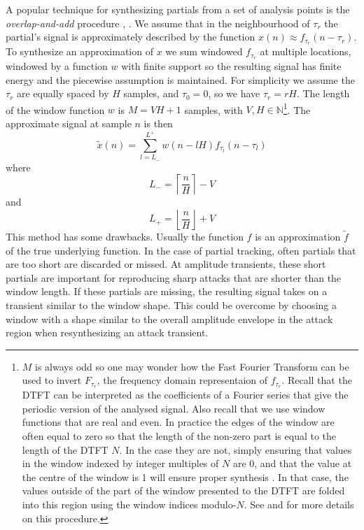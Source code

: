 A popular technique for synthesizing partials from a set of analysis points is
the \textit{overlap-and-add} procedure \cite{portnoff1976implementation},
\cite{moore1990elements}. We assume that in the neighbourhood of $\tau_{r}$ the
partial's signal is approximately described by the function $x(n) \approx
f_{\tau_{r}}(n-\tau_{r})$. To synthesize an approximation of $x$ we sum windowed
$f_{\tau_{r}}$ at multiple locations, windowed by a function $w$ with finite
support so the resulting signal has finite energy and the piecewise assumption
is maintained. For simplicity we assume the $\tau_{r}$ are equally spaced by $H$
samples, and $\tau_{0}=0$, so we have $\tau_{r} = rH$. The length of the window
function $w$ is $M = VH + 1$ samples, with $V,H \in \mathbb{N}%
$\footnote{%
    $M$ is always odd so one may wonder how the Fast Fourier Transform can be
    used to invert $F_{\tau_{r}}$, the frequency domain representaion of
    $f_{\tau_{r}}$.  Recall that the DTFT can be interpreted as the coefficients
    of a Fourier series that give the periodic version of the analysed signal.
    Also recall that we use window functions that are real and even. In practice
    the edges of the window are often equal to zero so that the length of the
    non-zero part is equal to the length of the DTFT $N$. In the case they are
    not, simply ensuring that values in the window indexed by integer multiples
    of $N$ are 0, and that the value at the centre of the window is 1 will ensure proper
    synthesis \cite[p.~244]{portnoff1976implementation}. In that case, the values
    outside of the part of the window presented to the DTFT are folded into this
    region using the window indices modulo-$N$. See
    \cite{portnoff1976implementation} and \cite{moore1990elements} for more details on this
    procedure.%
}.
The approximate signal at sample $n$ is then
\[
    \tilde{x}(n) = \sum_{l=L_{-}}^{L^{+}} w(n-lH) f_{\tau_l}(n-\tau_l)
\]
where
\[
    L_{-} = \left\lceil \frac{n}{H} \right\rceil - V
\]
and
\[
    L_{+} = \left\lfloor \frac{n}{H} \right\rfloor + V
\]
This method has some drawbacks. Usually the function $f$ is an approximation
$\tilde{f}$ of the true underlying function. In the case of partial tracking,
often partials that are too short are discarded or missed. At amplitude
transients, these short partials are important for reproducing sharp attacks
that are shorter than the window length. If these partials are missing, the
resulting signal takes on a transient similar to the window shape. This could be
overcome by choosing a window with a shape similar to the overall amplitude
envelope in the attack region when resynthesizing an attack transient.


